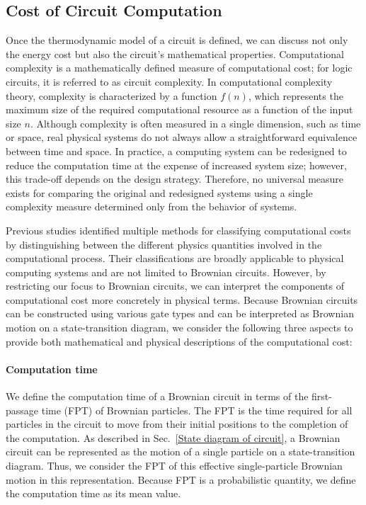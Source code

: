 \documentclass[%
 reprint,
superscriptaddress,
 amsmath,amssymb,
 aps,
 prx,
]{revtex4-2}
\begin{document}
\subsection{Cost of Circuit Computation}\label{Cost of Circuit Computation}
Once the thermodynamic model of a circuit is defined, we can discuss not only the energy cost but also the circuit's mathematical properties. Computational complexity is a mathematically defined measure of computational cost; for logic circuits, it is referred to as circuit complexity. 
In computational complexity theory, complexity is characterized by a function $f(n)$, which represents the maximum size of the required computational resource as a function of the input size $n$. 
Although complexity is often measured in a single dimension, such as time or space, real physical systems do not always allow a straightforward equivalence between time and space. In practice, a computing system can be redesigned to reduce the computation time at the expense of increased system size; however,  this trade-off depends on the design strategy. Therefore, no universal measure exists for comparing the original and redesigned systems using a single complexity measure determined only from the behavior of systems. 

Previous studies\cite{wolpert_is_2024} identified multiple methods for classifying computational costs by distinguishing between the different physics quantities involved in the computational process. 
Their classifications are broadly applicable to physical computing systems and are not limited to Brownian circuits. However, by restricting our focus to Brownian circuits, we can interpret the components of computational cost more concretely in physical terms.  
Because Brownian circuits can be constructed using various gate types and can be interpreted as Brownian motion on a state-transition diagram, we consider the following three aspects to provide both mathematical and physical descriptions of the computational cost: 
\paragraph{Computation time}
We define the computation time of a Brownian circuit in terms of the first-passage time (FPT) of Brownian particles. The FPT is the time required for all particles in the circuit to move from their initial positions to the completion of the computation. 
As described in Sec.~\ref{State diagram of circuit}, a Brownian circuit can be represented as the motion of a single particle on a state-transition diagram. Thus, we consider the FPT of this effective single-particle Brownian motion in this representation. 
Because FPT is a probabilistic quantity, we define the computation time as its mean value.
\end{document}

